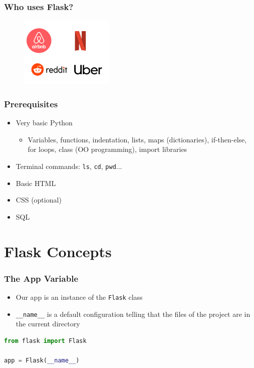 \documentclass[fleqn,aspectratio=169,10pt]{beamer}
\begin{document}
\begin{frame}[fragile]
  \frametitle{Who uses Flask?}
          \pause
  \begin{figure}[]
    \centering
    \includegraphics[width=0.4\textwidth]{companies}
  \end{figure}
\end{frame}

\begin{frame}
  \frametitle{Prerequisites}
  \begin{itemize}
          \pause
    \item Very basic Python
          \begin{itemize}
            \item Variables, functions, indentation, lists, maps (dictionaries), if-then-else, for loops, class (OO programming), import libraries
          \end{itemize}
    \item Terminal commands: \texttt{ls}, \texttt{cd}, \texttt{pwd}...
    \item Basic HTML
    \item CSS (optional)
    \item SQL
  \end{itemize}
\end{frame}

\section{Flask Concepts}

\begin{frame}[fragile]
  \frametitle{The App Variable}
  \begin{itemize}
    \item Our app is an instance of the \texttt{Flask} class
    \item \texttt{\_\_name\_\_} is a default configuration telling that the files of the project are in the current directory
  \end{itemize}
\begin{lstlisting}[language=Python]
from flask import Flask

app = Flask(__name__)
\end{lstlisting}
\end{frame}
\end{document}
